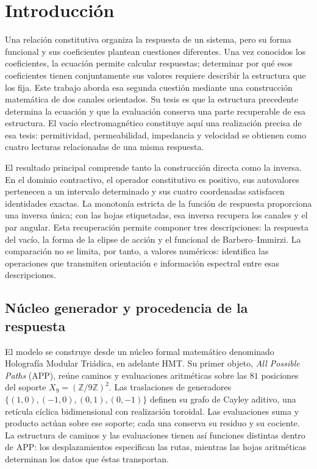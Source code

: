 \clearpage
\section{Introducción}
\label{iii:sec:introduccion}

Una relación constitutiva organiza la respuesta de un sistema, pero su
forma funcional y sus coeficientes plantean cuestiones diferentes. Una
vez conocidos los coeficientes, la ecuación permite calcular respuestas;
determinar por qué esos coeficientes tienen conjuntamente sus valores
requiere describir la estructura que los fija. Este trabajo aborda esa
segunda cuestión mediante una construcción matemática de dos canales
orientados. Su tesis es que la estructura precedente determina la
ecuación y que la evaluación conserva una parte recuperable de esa
estructura. El vacío electromagnético constituye aquí una realización
precisa de esa tesis: permitividad, permeabilidad, impedancia y velocidad
se obtienen como cuatro lecturas relacionadas de una misma respuesta.

El resultado principal comprende tanto la construcción directa como la
inversa. En el dominio contractivo, el operador constitutivo es positivo,
sus autovalores pertenecen a un intervalo determinado y sus cuatro
coordenadas satisfacen identidades exactas. La monotonía estricta de la
función de respuesta proporciona una inversa única; con las hojas
etiquetadas, esa inversa recupera los canales y el par angular. Esta
recuperación permite componer tres descripciones: la respuesta del
vacío, la forma de la elipse de acción y el funcional de
Barbero--Immirzi. La comparación no se limita, por tanto, a valores
numéricos: identifica las operaciones que transmiten orientación e
información espectral entre esas descripciones.

\subsection{Núcleo generador y procedencia de la respuesta}

El modelo se construye desde un núcleo formal matemático denominado
Holografía Modular Triádica, en adelante HMT. Su primer objeto,
\emph{All Possible Paths} (APP), reúne caminos y evaluaciones
aritméticas sobre las $81$ posiciones del soporte
$X_9=(\mathbb Z/9\mathbb Z)^2$. Las traslaciones de generadores
$\{(1,0),(-1,0),(0,1),(0,-1)\}$ definen su grafo de Cayley aditivo,
una retícula cíclica bidimensional con realización toroidal. Las
evaluaciones suma y producto actúan sobre ese soporte; cada una conserva
su residuo y su cociente. La estructura de caminos y las evaluaciones
tienen así funciones distintas dentro de APP: los desplazamientos
especifican las rutas, mientras las hojas aritméticas determinan los
datos que éstas transportan.

